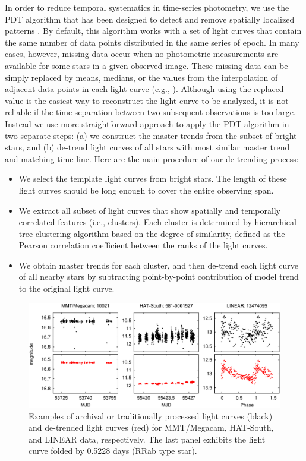 In order to reduce temporal systematics in time-series photometry, we use the PDT algorithm that has been designed to detect and remove spatially localized patterns \citep{kim09}.  By default, this algorithm works with a set of light curves that contain the same number of data points distributed in the same series of epoch.  In many cases, however, missing data occur when no photometric measurements are available for some stars in a given observed image.  These missing data can be simply replaced by means, medians, or the values from the interpolation of adjacent data points in each light curve (e.g., \citealt{kov05, kim10}).  Although using the replaced value is the easiest way to reconstruct the light curve to be analyzed, it is not reliable if the time separation between two subsequent observations is too large.  Instead we use more straightforward approach to apply the PDT algorithm in two separate steps: (a) we construct the master trends from the subset of bright stars, and (b) de-trend light curves of all stars with most similar master trend and matching time line.  Here are the main procedure of our de-trending process: \begin{itemize}
\item{We select the template light curves from bright stars.  The length of these light curves should be long enough to cover the entire observing span.}

\item{We extract all subset of light curves that show spatially and temporally correlated features (i.e., clusters).  Each cluster is determined by hierarchical tree clustering algorithm based on the degree of similarity, defined as the Pearson correlation coefficient between the ranks of the light curves.}

\item{We obtain master trends for each cluster, and then de-trend each light curve of all nearby stars by subtracting point-by-point contribution of model trend to the original light curve.}
\end{itemize} 

\begin{figure}[!t]
\begin{center}
\includegraphics[scale=0.42]{part2/Chang_O07/O07_f2.eps}
\caption{Examples of archival or traditionally processed light curves (black) and de-trended light curves (red) for MMT/Megacam, HAT-South, and LINEAR data, respectively.  The last panel exhibits the light curve folded by 0.5228 days (RRab type star).}
\end{center}
\label{Fig2}
\end{figure}

